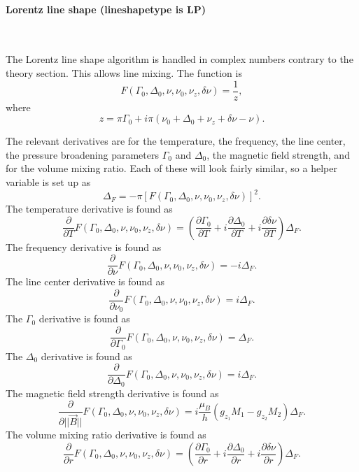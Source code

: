 \paragraph*{Lorentz line shape (lineshapetype is LP)} \

The Lorentz line shape algorithm is handled in complex numbers contrary to the
theory section.  This allows line mixing.  The function is
\begin{equation}
 F(\Gamma_0, \Delta_0, \nu, \nu_0, \nu_z, \delta\nu) = \frac{1}{z},
\end{equation}
where
\begin{equation}
 z = \pi \Gamma_0 + i\pi\left(\nu_0 + \Delta_0 + \nu_z + \delta\nu - \nu\right).
\end{equation}

The relevant derivatives are for the temperature, the frequency, the line center,
the pressure broadening parameters $\Gamma_0$ and $\Delta_0$, the magnetic field
strength, and for the volume mixing ratio.  Each of these will look fairly similar,
so a helper variable is set up as
\begin{equation}
 \Delta_F = -\pi \left[F(\Gamma_0, \Delta_0, \nu, \nu_0, \nu_z, \delta\nu)\right]^2.
\end{equation}
The temperature derivative is found as
\begin{equation}
 \frac{\partial}{\partial T} F(\Gamma_0, \Delta_0, \nu, \nu_0, \nu_z, \delta\nu) = \left(\frac{\partial\Gamma_0}{\partial T} + i\frac{\partial\Delta_0}{\partial T}+i\frac{\partial\delta\nu}{\partial T}\right) \Delta_F.
\end{equation}
The frequency derivative is found as
\begin{equation}
 \frac{\partial}{\partial \nu} F(\Gamma_0, \Delta_0, \nu, \nu_0, \nu_z, \delta\nu) = -i\Delta_F.
\end{equation}
The line center derivative is found as
\begin{equation}
 \frac{\partial}{\partial \nu_0} F(\Gamma_0, \Delta_0, \nu, \nu_0, \nu_z, \delta\nu) = i\Delta_F.
\end{equation}
The $\Gamma_0$ derivative is found as
\begin{equation}
 \frac{\partial}{\partial \Gamma_0} F(\Gamma_0, \Delta_0, \nu, \nu_0, \nu_z, \delta\nu) = \Delta_F.
\end{equation}
The $\Delta_0$ derivative is found as
\begin{equation}
 \frac{\partial}{\partial \Delta_0} F(\Gamma_0, \Delta_0, \nu, \nu_0, \nu_z, \delta\nu) = i\Delta_F.
\end{equation}
The magnetic field strength derivative is found as
\begin{equation}
 \frac{\partial}{\partial ||\vec{B}||} F(\Gamma_0, \Delta_0, \nu, \nu_0, \nu_z, \delta\nu) = i \frac{\mu_B}{h}\left(g_{z_1}M_1 - g_{z_2}M_2\right) \Delta_F.
\end{equation}
The volume mixing ratio derivative is found as
\begin{equation}
 \frac{\partial}{\partial r} F(\Gamma_0, \Delta_0, \nu, \nu_0, \nu_z, \delta\nu) = \left(\frac{\partial\Gamma_0}{\partial r} + i\frac{\partial\Delta_0}{\partial r}+i\frac{\partial\delta\nu}{\partial r}\right) \Delta_F.
\end{equation}

